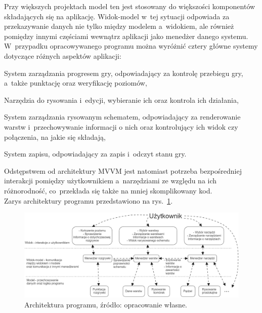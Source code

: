 Przy większych projektach model ten jest stosowany do większości komponentów składających się na aplikację.
Widok-model w~tej sytuacji odpowiada za przekazywanie danych nie tylko między modelem a~widokiem,
ale również pomiędzy innymi częściami wewnątrz aplikacji jako menedżer danego systemu.
W~przypadku opracowywanego programu można wyróżnić cztery główne systemy dotyczące różnych aspektów aplikacji:

\begin{citemize}
    \item System zarządzania progresem gry, odpowiadający za kontrolę przebiegu gry,
    a~także punktację oraz weryfikację poziomów,
    \item Narzędzia do rysowania i~edycji, wybieranie ich oraz kontrola ich działania,
    \item System zarządzania rysowanym schematem,
    odpowiadający za renderowanie warstw i~przechowywanie informacji o nich
    oraz kontrolujący ich widok czy połączenia, na jakie się składają,
    \item System zapisu, odpowiadający za zapis i~odczyt stanu gry.
\end{citemize}

Odstępstwem od architektury MVVM jest natomiast potrzeba bezpośredniej interakcji pomiędzy użytkownikiem
a~narzędziami ze względu na ich różnorodność, co~przekłada się także na mniej skomplikowany kod.\\
Zarys architektury programu przedstawiono na rys.~\ref{fig:architektura}.

\begin{figure}[h!]
    \centering
    \includegraphics[width=\textwidth]{chapters/chapter3/rys/arch}
    \caption[Architektura programu.]{Architektura programu, źródło: opracowanie własne.}
    \label{fig:architektura}
\end{figure}


